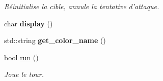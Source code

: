 \begin{DoxyCompactItemize}
\begin{DoxyCompactList}\small\item\em Réinitialise la cible, annule la tentative d'attaque. \end{DoxyCompactList}\item 
\hypertarget{classColonized__planet_a1d3897c8ef1772fa9908fee7c5830f77}{char {\bfseries display} ()}\label{classColonized__planet_a1d3897c8ef1772fa9908fee7c5830f77}

\item 
\hypertarget{classColonized__planet_af8e3c6d3e72bf80b2e44013ceba2087f}{std\-::string {\bfseries get\-\_\-color\-\_\-name} ()}\label{classColonized__planet_af8e3c6d3e72bf80b2e44013ceba2087f}

\item 
bool \hyperlink{classColonized__planet_a00293269f8b2ce00b45a23d89cb48015}{run} ()
\begin{DoxyCompactList}\small\item\em Joue le tour. \end{DoxyCompactList}\end{DoxyCompactItemize}
